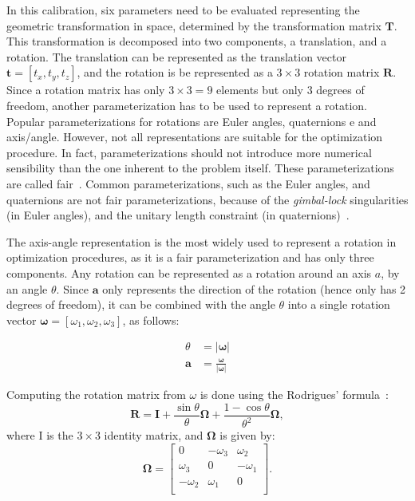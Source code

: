 \documentclass[conference]{IEEEtran}
\begin{document}
In this calibration, six parameters need to be evaluated representing the geometric transformation in space, determined by the transformation matrix $\bm{T}$. This transformation is decomposed into two components, a translation, and a rotation. The translation can be represented as the translation vector $\mathbf{t} = \left[t_x, t_y, t_z\right]$, and the rotation is be represented as a $3 \times 3$ rotation matrix $\bm{R}$. Since a rotation matrix has only $3 \times 3 = 9$ elements but only 3 degrees of freedom, another parameterization has to be used to represent a rotation. Popular parameterizations for rotations are Euler angles, quaternions e and axis/angle. However, not all representations are suitable for the optimization procedure. In fact, parameterizations should not introduce more numerical sensibility than the one inherent to the problem itself. These parameterizations are called fair~\cite{hornegger99}. Common parameterizations, such as the Euler angles, and quaternions are not fair parameterizations, because of the \textit{gimbal-lock} singularities (in Euler angles), and the unitary length constraint (in quaternions)~\cite{schmidt01}.

The axis-angle representation is the most widely used to represent a rotation in optimization procedures, as it is a fair parameterization and has only three components. Any rotation can be represented as a rotation around an axis $a$, by an angle $\theta$. Since $\bm{a}$ only represents the direction of the rotation (hence only has 2 degrees of freedom), it can be combined with the angle $\theta$ into a single rotation vector $\bm{\omega} = \left[\omega_1, \omega_2, \omega_3\right]$, as follows:

\begin{equation}
    \label{eqn:axis-angle}
    \begin{aligned}
        \theta & = |\bm{\omega}| \\
        \bm{a} & = \frac{\bm{\omega}}{|\bm{\omega}|}
    \end{aligned}
\end{equation}

Computing the rotation matrix from $\omega$ is done using the Rodrigues' formula~\cite{schmidt01}:
%
\begin{equation}
    \textbf{R} = \bm{I} + \frac{\sin \theta}{\theta} \bm{\Omega} + \frac{1 - \cos \theta}{\theta^2} \bm{\Omega},
\end{equation}
%
\noindent
where I is the $3\times3$ identity matrix, and $\bm{\Omega}$ is given by:
%
\begin{equation}
    \bm{\Omega} = \left[
        \begin{array}{ccc}
            0  & -\omega_3 & \omega_2 \\
            \omega_3 & 0   & -\omega_1 \\
            -\omega_2 & \omega_1 & 0 \\
        \end{array}
    \right].
\end{equation}
\end{document}
